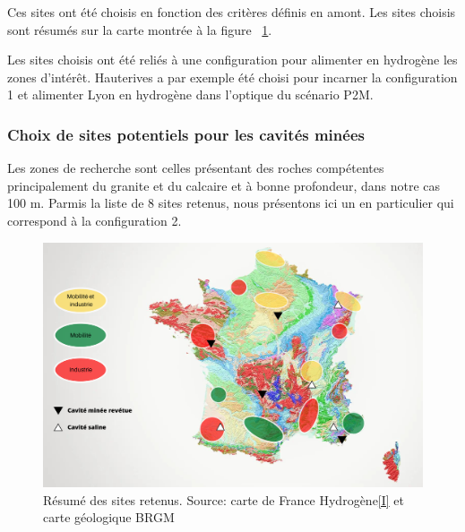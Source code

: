 \documentclass[11pt,french,a4paper]{article}
\begin{document}
\begin{multicols}{2}
Ces sites ont été choisis en fonction des critères définis en amont. Les sites choisis sont résumés sur la carte montrée à la figure ~\ref{fig:carteResumee}.

Les sites choisis ont été reliés à une configuration pour alimenter en hydrogène les zones d’intérêt. Hauterives a par exemple été choisi pour incarner la configuration 1 et alimenter Lyon en hydrogène dans l’optique du scénario P2M. 

\end{multicols}

\subsubsection{Choix de sites potentiels pour les cavités minées}
Les zones de recherche sont celles présentant des roches compétentes principalement du granite et du calcaire et à bonne profondeur, dans notre cas 100 m.
Parmis la liste de 8 sites retenus, nous présentons ici un en particulier qui correspond à la configuration 2.

\begin{figure}[!h]
\centering
\includegraphics[width=.8\linewidth]{image/chap4/Mobilité et industrie recadré.PNG}
\caption{Résumé des sites retenus. Source: carte de France Hydrogène\hyperref[sec:presRef]{[I]} et carte géologique BRGM\cite{InfoTerreCarte}}
\label{fig:carteResumee}
\end{figure}
\end{document}
